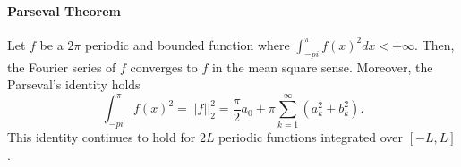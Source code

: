 \paragraph{Parseval Theorem}
Let \(f\) be a \(2\pi\) periodic and bounded function where
\(\int_{-pi}^\pi f(x)^2 dx < +\infty\). Then, the Fourier series of \(f\) converges to \(f\) in the mean square sense. Moreover, the Parseval's
identity holds
\[
\int_{-pi}^\pi f(x)^2 = ||f||_2^2 = \frac{\pi}{2}a_0 +
\pi \sum_{k=1}^\infty  (a_k^2 +b_k^2).
\]
This identity continues to hold for \(2L\) periodic functions integrated
over \([-L, L]\).


